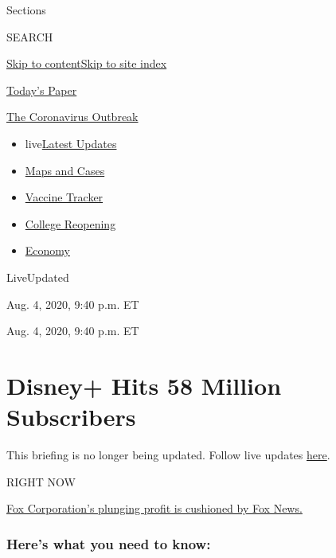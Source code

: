 Sections

SEARCH

\protect\hyperlink{site-content}{Skip to
content}\protect\hyperlink{site-index}{Skip to site index}

\href{https://myaccount.nytimes.com/auth/login?response_type=cookie\&client_id=vi}{}

\href{https://www.nytimes.com/section/todayspaper}{Today's Paper}

\href{https://www.nytimes.com/news-event/coronavirus}{The Coronavirus
Outbreak}

\begin{itemize}
\tightlist
\item
  live\href{https://www.nytimes.com/2020/08/04/world/coronavirus-cases.html}{Latest
  Updates}
\item
  \href{https://www.nytimes.com/interactive/2020/us/coronavirus-us-cases.html}{Maps
  and Cases}
\item
  \href{https://www.nytimes.com/interactive/2020/science/coronavirus-vaccine-tracker.html}{Vaccine
  Tracker}
\item
  \href{https://www.nytimes.com/2020/08/02/us/covid-college-reopening.html}{College
  Reopening}
\item
  \href{https://www.nytimes.com/live/2020/08/04/business/stock-market-today-coronavirus}{Economy}
\end{itemize}

LiveUpdated~

Aug. 4, 2020, 9:40 p.m. ET

Aug. 4, 2020, 9:40 p.m. ET

\hypertarget{disney-hits-58-million-subscribers}{%
\section{Disney+ Hits 58 Million
Subscribers}\label{disney-hits-58-million-subscribers}}

This briefing is no longer being updated. Follow live updates
\href{https://www.nytimes.com/2020/08/04/world/coronavirus-cases.html}{here}.

RIGHT NOW

\protect\hyperlink{fox-corporations-plunging-profit-is-cushioned-by-fox-news}{Fox
Corporation's plunging profit is cushioned by Fox News.}

\hypertarget{heres-what-you-need-to-know}{%
\subsubsection{Here's what you need to
know:}\label{heres-what-you-need-to-know}}

